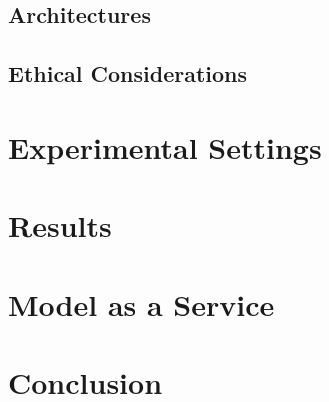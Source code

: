 \documentclass{UoYCSproject}
\begin{document}
\section{Architectures}\label{sec:architectures}

\section{Ethical Considerations}\label{sec:ethical-considerations}

\chapter{Experimental Settings}
\label{ch:experimental-settings}

\chapter{Results}
\label{ch:results}

\chapter{Model as a Service}
\label{ch:model-as-a-service}

\chapter{Conclusion}
\label{ch:conclusion}

\printbibliography
\end{document}

